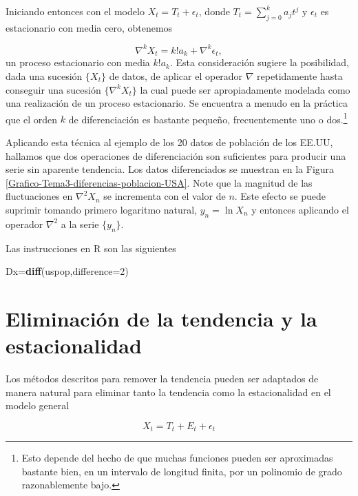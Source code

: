 \documentclass[12pt,]{krantz}
\makeatletter
\newenvironment{Shaded}{\begin{snugshade}}{\end{snugshade}}
\newcommand{\KeywordTok}[1]{\textcolor[rgb]{0.13,0.29,0.53}{\textbf{#1}}}
\newcommand{\DataTypeTok}[1]{\textcolor[rgb]{0.13,0.29,0.53}{#1}}
\newcommand{\DecValTok}[1]{\textcolor[rgb]{0.00,0.00,0.81}{#1}}
\newcommand{\NormalTok}[1]{#1}
\newenvironment{kframe}{%
\medskip{}
\setlength{\fboxsep}{.8em}
 \def\at@end@of@kframe{}%
 \ifinner\ifhmode%
  \def\at@end@of@kframe{\end{minipage}}%
  \begin{minipage}{\columnwidth}%
 \fi\fi%
 \def\FrameCommand##1{\hskip\@totalleftmargin \hskip-\fboxsep
 \colorbox{shadecolor}{##1}\hskip-\fboxsep
     \hskip-\linewidth \hskip-\@totalleftmargin \hskip\columnwidth}%
 \MakeFramed {\advance\hsize-\width
   \@totalleftmargin\z@ \linewidth\hsize
   \@setminipage}}%
 {\par\unskip\endMakeFramed%
 \at@end@of@kframe}
\renewenvironment{Shaded}{\begin{kframe}}{\end{kframe}}
\theoremstyle{definition}
\theoremstyle{definition}
\theoremstyle{definition}
\theoremstyle{remark}
\makeatother
\begin{document}
Iniciando entonces con el modelo \(X_t=T_t+\epsilon_t\), donde
\(T_t=\sum_{j=0}^ka_jt^j\) y \(\epsilon_t\) es estacionario con media
cero, obtenemos

\[\nabla^kX_t = k!a_k+\nabla^k\epsilon_t,\] un proceso estacionario con
media \(k!a_k\). Esta consideración sugiere la posibilidad, dada una
sucesión \(\{X_t\}\) de datos, de aplicar el operador \(\nabla\)
repetidamente hasta conseguir una sucesión \(\{\nabla^kX_t\}\) la cual
puede ser apropiadamente modelada como una realización de un proceso
estacionario. Se encuentra a menudo en la práctica que el orden \(k\) de
diferenciación es bastante pequeño, frecuentemente uno o
dos.\footnote{Esto depende del hecho de que muchas funciones pueden ser aproximadas bastante bien, en un intervalo de longitud finita, por un polinomio de grado razonablemente bajo.}

Aplicando esta técnica al ejemplo de los 20 datos de población de los
EE.UU, hallamos que dos operaciones de diferenciación son suficientes
para producir una serie sin aparente tendencia. Los datos diferenciados
se muestran en la Figura \ref{Grafico-Tema3-diferencias-poblacion-USA}.
Note que la magnitud de las fluctuaciones en \(\nabla^2X_n\) se
incrementa con el valor de \(n\). Este efecto se puede suprimir tomando
primero logaritmo natural, \(y_n=\ln X_n\) y entonces aplicando el
operador \(\nabla^2\) a la serie \(\{y_n\}\).

Las instrucciones en R son las siguientes

\begin{Shaded}
\begin{Highlighting}[]
\NormalTok{Dx=}\KeywordTok{diff}\NormalTok{(uspop,}\DataTypeTok{difference=}\DecValTok{2}\NormalTok{)}
\end{Highlighting}
\end{Shaded}

\section{Eliminación de la tendencia y la
estacionalidad}\label{eliminacion-de-la-tendencia-y-la-estacionalidad}

Los métodos descritos para remover la tendencia pueden ser adaptados de
manera natural para eliminar tanto la tendencia como la estacionalidad
en el modelo general

\begin{equation}
X_t = T_t + E_t + \epsilon_t
\end{equation}
\end{document}

